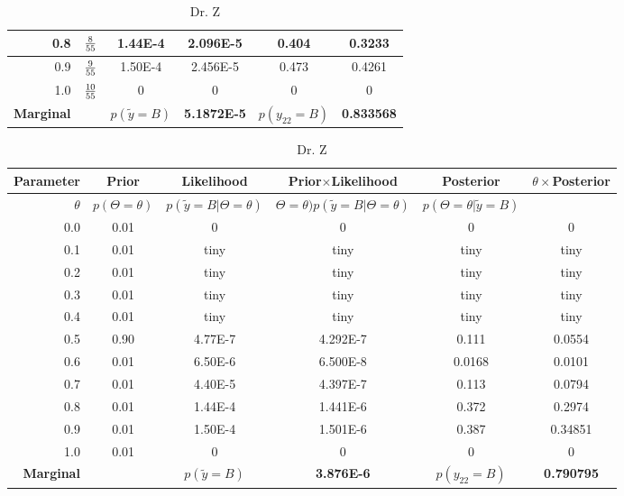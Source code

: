 \documentclass{article}
\begin{document}
\begin{table}
\begin{flushleft}
\begin{tabular}{| r | c | c | c | c | c |}
	0.8 & \(8 \over 55\) & 1.44E-4 & 2.096E-5 & 0.404 & 0.3233 \\ \hline
	0.9 & \(9 \over 55\) & 1.50E-4 & 2.456E-5 & 0.473 & 0.4261 \\ \hline
	1.0 & \(10 \over 55\) & 0 & 0 & 0 & 0 \\ \hline
	\textbf{Marginal} & &\(p(\tilde{y} = B)\) & \textbf{5.1872E-5} & \(p(y_{22} = B)\) & \textbf{0.833568} \\ \hline
  \end{tabular}
\end{flushleft}
\caption{Dr. Y}
\begin{flushleft}
  \begin{tabular}{| r | c | c | c | c | c |}
\hline
    \textbf{Parameter} & \textbf{Prior} & \textbf{Likelihood} & \textbf{Prior}\(\times\)\textbf{Likelihood} & \textbf{Posterior} & \(\theta \times \)Posterior  \\ \hline
	\textbf{\(\theta\)} & \(p(\Theta=\theta)\) & \(p(\tilde{y} = B \vert \Theta=\theta)\) & \(\Theta=\theta)p(\tilde{y} = B \vert \Theta=\theta)\) & \(p( \Theta=\theta \vert \tilde{y} = B)\) & \\ \hline \hline
	0.0 & 0.01 & 0 & 0 & 0 & 0\\ \hline
	0.1 & 0.01 & tiny & tiny & tiny & tiny \\ \hline
	0.2 & 0.01& tiny & tiny & tiny & tiny \\ \hline
	0.3 & 0.01 & tiny & tiny & tiny & tiny\\ \hline
	0.4 & 0.01 & tiny & tiny & tiny & tiny \\ \hline
	0.5 & 0.90 & 4.77E-7 & 4.292E-7 & 0.111 & 0.0554\\ \hline
	0.6 & 0.01 & 6.50E-6 & 6.500E-8 & 0.0168 & 0.0101 \\ \hline
	0.7 & 0.01 & 4.40E-5 & 4.397E-7 & 0.113 & 0.0794 \\ \hline
	0.8 & 0.01 & 1.44E-4 & 1.441E-6 & 0.372 & 0.2974 \\ \hline
	0.9 & 0.01 & 1.50E-4 & 1.501E-6 & 0.387 & 0.34851 \\ \hline
	1.0 & 0.01 & 0 & 0 & 0 & 0\\ \hline
	\textbf{Marginal} & &\(p(\tilde{y} = B)\) & \textbf{3.876E-6} &  \(p(y_{22} = B)\) & \textbf{0.790795} \\ \hline
  \end{tabular}
\end{flushleft}
\caption{Dr. Z}
\end{table}


\newpage
\end{document}
